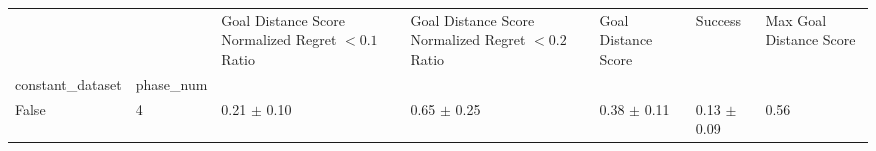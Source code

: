 \begin{tabular}{lllllll}
\toprule
 &  & Goal Distance Score Normalized Regret $< 0.1$ Ratio & Goal Distance Score Normalized Regret $< 0.2$ Ratio & Goal Distance Score & Success & Max Goal Distance Score \\
constant_dataset & phase_num &  &  &  &  &  \\
\midrule
False & 4 & 0.21 $\pm$ 0.10 & 0.65 $\pm$ 0.25 & 0.38 $\pm$ 0.11 & 0.13 $\pm$ 0.09 & 0.56 \\
\cline{1-7}
\bottomrule
\end{tabular}
